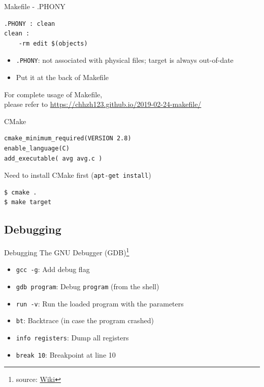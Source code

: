 \documentclass{../TexTemplate/myslide}
\begin{document}
\begin{frame}[fragile]{Makefile - .PHONY}
\begin{verbatim}
.PHONY : clean
clean :
	-rm edit $(objects)
\end{verbatim}
\begin{itemize}
	\item \verb'.PHONY': not associated with physical files; target is always out-of-date
	\item Put it at the back of Makefile
\end{itemize}
\scriptsize * For complete usage of Makefile,\\
\quad please refer to \url{https://chhzh123.github.io/2019-02-24-makefile/}
\end{frame}

\begin{frame}[fragile]{CMake}
\begin{verbatim}
cmake_minimum_required(VERSION 2.8)
enable_language(C)
add_executable( avg avg.c )
\end{verbatim}
Need to install CMake first (\verb'apt-get install')
\begin{verbatim}
$ cmake .
$ make target
\end{verbatim}
\end{frame}

\subsection{Debugging}
\begin{frame}
\subsectionpage
\end{frame}

\begin{frame}[fragile]{Debugging}
The GNU Debugger (GDB)\footnote{\scriptsize source: \href{https://en.wikipedia.org/wiki/GNU_Debugger}{Wiki}}
\begin{itemize}
\item \verb'gcc -g': Add debug flag
\item \verb'gdb program': Debug \verb'program' (from the shell)
\item \verb'run -v': Run the loaded program with the parameters
\item \verb'bt': Backtrace (in case the program crashed)
\item \verb'info registers': Dump all registers
\item \verb'break 10': Breakpoint at line 10
\end{itemize}
\end{frame}
\end{document}

